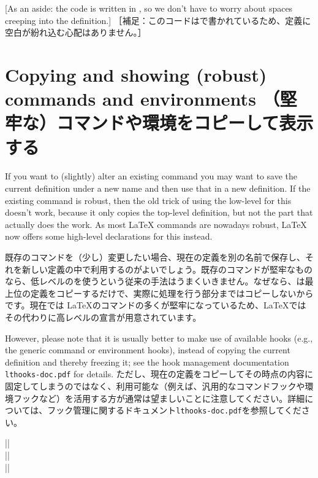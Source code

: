 \documentclass{ltxguide}
\newcommand\jpnewline{\vspace{3pt}\newline}
\begin{document}
[As an aside: the code is written in , so we don't have to
  worry about spaces creeping into the definition.]
\jpnewline
［補足：このコードはで書かれているため、定義に空白が紛れ込む心配はありません。］

\section{Copying and showing (robust) commands and environments
（堅牢な）コマンドや環境をコピーして表示する}

If you want to (slightly) alter an existing command you may want to
save the current definition under a new name and then use that in a
new definition. If the existing command is robust, then the old trick of
using the low-level  for this doesn't work, because it only
copies the top-level definition, but not the part that actually does
the work. As most \LaTeX{} commands are nowadays robust, \LaTeX{}
now offers some high-level declarations for this instead.

既存のコマンドを（少し）変更したい場合、現在の定義を別の名前で保存し、それを新しい定義の中で利用するのがよいでしょう。既存のコマンドが堅牢なものなら、低レベルのを使うという従来の手法はうまくいきません。なぜなら、は最上位の定義をコピーするだけで、実際に処理を行う部分まではコピーしないからです。現在では \LaTeX{}のコマンドの多くが堅牢になっているため、\LaTeX{}ではその代わりに高レベルの宣言が用意されています。

However, please note that it is usually better to make use of
available hooks (e.g., the generic command or environment hooks),
instead of copying the current definition and thereby freezing it; see
the hook management documentation \texttt{lthooks-doc.pdf} for
details.
\jpnewline
ただし、現在の定義をコピーしてその時点の内容に固定してしまうのではなく、利用可能な（例えば、汎用的なコマンドフックや環境フックなど）を活用する方が通常は望ましいことに注意してください。詳細については、フック管理に関するドキュメント\texttt{lthooks-doc.pdf}を参照してください。

\begin{decl}
  |\NewCommandCopy|         \\
  |\RenewCommandCopy|       \\
  |\DeclareCommandCopy|    
\end{decl}
\end{document}
